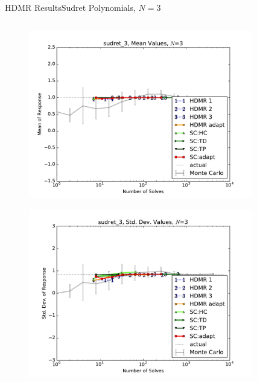 \documentclass{beamer}
\begin{document}
\begin{frame}{HDMR Results}{Sudret Polynomials, $N=3$}\vspace{-20pt}
 \begin{columns}
   \begin{column}{0.5\textwidth}
        \begin{figure}[h!]
          \centering
          \includegraphics[width=0.8\linewidth]{anlmodels/sudret_3_mean_vals}
        \end{figure}
        \vspace{-20pt}
        \begin{figure}[h!]
          \centering
          \includegraphics[width=0.8\linewidth]{anlmodels/sudret_3_var_vals}
        \end{figure}
   \end{column}
   \begin{column}{0.5\textwidth}
        \begin{figure}[h!]
          \centering

\end{figure}
\end{column}
\end{columns}
\end{frame}
\end{document}
